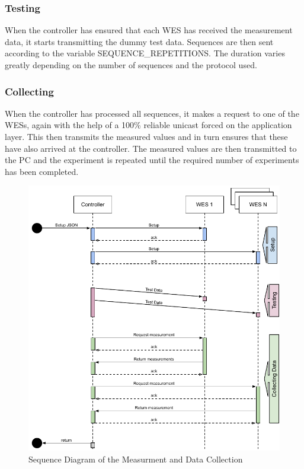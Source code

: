 \subsubsection*{Testing}
When the controller has ensured that each WES has received the measurement data, it starts transmitting the dummy test data.
Sequences are then sent according to the variable SEQUENCE\_REPETITIONS.
The duration varies greatly depending on the number of sequences and the protocol used.
\subsubsection*{Collecting}
When the controller has processed all sequences, it makes a request to one of the WESs, 
again with the help of a 100\% reliable unicast forced on the application layer.
This then transmits the measured values and in turn ensures that these have also arrived at the controller.
The measured values are then transmitted to the PC and the experiment is repeated until the required number of experiments has been completed.

\begin{figure}[h]
	\centering
	\includegraphics[scale=0.9]{figures/sequence_diagram_drive.pdf}
	\caption{Sequence Diagram of the Measurment and Data Collection}
	\label{fig:sequenceDiagram}
\end{figure}

